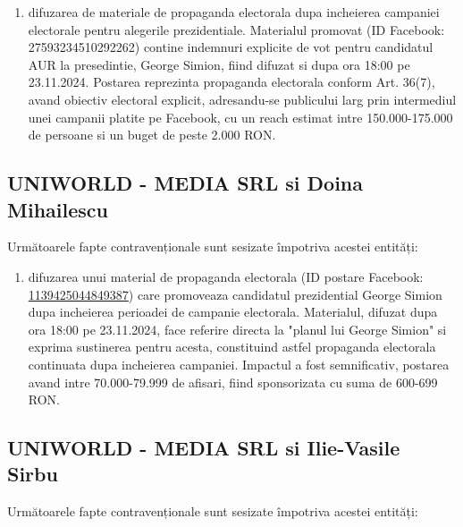 \documentclass[a4paper,12pt]{article}
\begin{document}
\begin{enumerate}[leftmargin=*, label=\arabic*.)]
    \item difuzarea de materiale de propaganda electorala dupa incheierea campaniei electorale pentru alegerile prezidentiale. Materialul promovat (ID Facebook: 27593234510292262) contine indemnuri explicite de vot pentru candidatul AUR la presedintie, George Simion, fiind difuzat si dupa ora 18:00 pe 23.11.2024. Postarea reprezinta propaganda electorala conform Art. 36(7), avand obiectiv electoral explicit, adresandu-se publicului larg prin intermediul unei campanii platite pe Facebook, cu un reach estimat intre 150.000-175.000 de persoane si un buget de peste 2.000 RON.
\end{enumerate}

\vspace{0.5cm}

\subsection{UNIWORLD - MEDIA SRL si Doina Mihailescu}
Următoarele fapte contravenționale sunt sesizate împotriva acestei entități:

\begin{enumerate}[leftmargin=*, label=\arabic*.)]
    \item difuzarea unui material de propaganda electorala (ID postare Facebook: \href{https://www.facebook.com/ads/library/?id=1139425044849387}{1139425044849387}) care promoveaza candidatul prezidential George Simion dupa incheierea perioadei de campanie electorala. Materialul, difuzat dupa ora 18:00 pe 23.11.2024, face referire directa la "planul lui George Simion" si exprima sustinerea pentru acesta, constituind astfel propaganda electorala continuata dupa incheierea campaniei. Impactul a fost semnificativ, postarea avand intre 70.000-79.999 de afisari, fiind sponsorizata cu suma de 600-699 RON.
\end{enumerate}

\vspace{0.5cm}

\subsection{UNIWORLD - MEDIA SRL si Ilie-Vasile Sirbu}
Următoarele fapte contravenționale sunt sesizate împotriva acestei entități:
\end{document}
